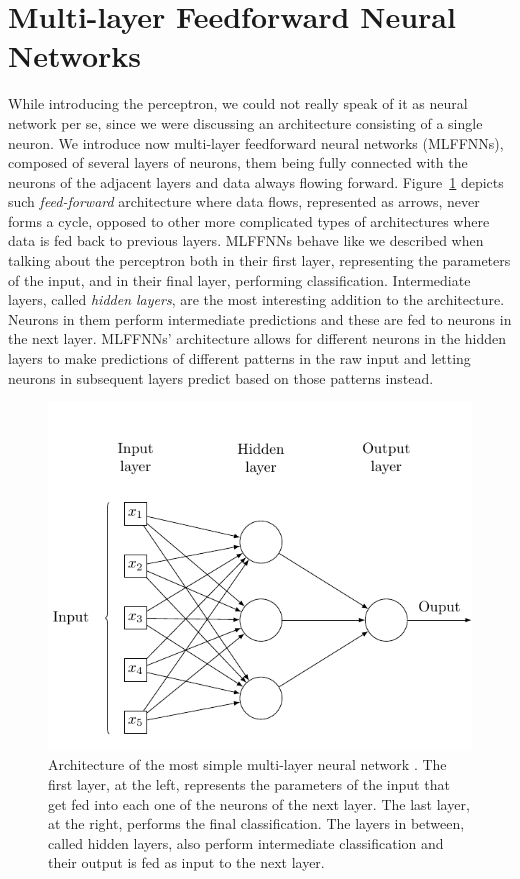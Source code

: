 
\section{Multi-layer Feedforward Neural Networks}
\label{sec:theory:mlffnn}

While introducing the perceptron, we could not really speak of it as neural network per se, since we were discussing an architecture consisting of a single neuron.
We introduce now multi-layer feedforward neural networks (MLFFNNs), composed of several layers of neurons, them being fully connected with the neurons of the adjacent layers and data always flowing forward.
Figure~\ref{fig:sec:theory:mlffnn} depicts such \emph{feed-forward} architecture where data flows, represented as arrows, never forms a cycle, opposed to other more complicated types of architectures where data is fed back to previous layers.
MLFFNNs behave like we described when talking about the perceptron both in their first layer, representing the parameters of the input, and in their final layer, performing classification.
Intermediate layers, called \emph{hidden layers}, are the most interesting addition to the architecture.
Neurons in them perform intermediate predictions and these are fed to neurons in the next layer.
MLFFNNs' architecture allows for different neurons in the hidden layers to make predictions of different patterns in the raw input and letting neurons in subsequent layers predict based on those patterns instead.

\begin{figure}[htb]
  \includegraphics[width=\textwidth]{tkz/mlffnn}
  \caption{
    Architecture of the most simple multi-layer neural network \cite{Medina2013A}.
    The first layer, at the left, represents the parameters of the input that get fed into each one of the neurons of the next layer.
    The last layer, at the right, performs the final classification.
    The layers in between, called hidden layers, also perform intermediate classification and their output is fed as input to the next layer.
  }
  \label{fig:sec:theory:mlffnn}
\end{figure}

